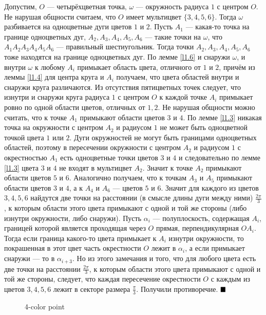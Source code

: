 \documentclass[12pt,a4paper]{article}
\renewcommand{\qed}{$\blacksquare \vspace{5mm}$}
\begin{document}
Допустим, $O$ --- четырёхцветная точка, $\omega$ --- окружность радиуса $1$ с центром $O$. Не нарушая общности считаем, что $O$ имеет мультицвет $\{3, 4, 5, 6\}$. Тогда $\omega$ разбивается на одноцветные дуги цветов $1$ и $2$. Пусть $A_1$ --- какая-то точка на границе одноцветных дуг, $A_2, A_3, A_4, A_5, A_6$ --- такие точки на $\omega$, что $A_1A_2A_3A_4A_5A_6$ --- правильный шестиугольник. Тогда точки $A_2, A_3, A_4, A_5, A_6$ тоже находятся на границе одноцветных дуг. По лемме \ref{l1.6} и снаружи $\omega$, и внутри $\omega$ к любому $A_i$ примыкает область цвета, отличного от $1$ и $2$, причём из леммы \ref{l1.4} для центра круга и $A_i$ получаем, что цвета областей внутри и снаружи круга различаются. Из отсутствия пятицветных точек следует, что изнутри и снаружи круга радиуса $1$ с центром $O$ к каждой точке $A_i$ примыкает ровно по одной области цветов, отличных от $1, 2$. Не нарушая общности можно считать, что к точке $A_1$ примыкают области цветов $3$ и $4$. По лемме \ref{l1.3} никакая точка на окружности с центром $A_2$ и радиусом $1$ не может быть одноцветной точкой цвета $1$ или $2$. Дуги окружностей не могут быть границами одноцветных областей, поэтому в пересечении окружности с центром $A_2$ и радиусом $1$ с окрестностью $A_1$ есть одноцветные точки цветов $3$ и $4$ и следовательно по лемме \ref{l1.3} цвета $3$ и $4$ не входят в мультицвет $A_2$. Значит к точке $A_2$ примыкают области цветов $5$ и $6$. Аналогично получаем, что к точкам $A_3$ и $A_5$ примыкают области цветов $3$ и $4$, а к $A_4$ и $A_6$ --- цветов $5$ и $6$. Значит для каждого из цветов $3, 4, 5, 6$ найдутся две точки на расстоянии (в смысле длины дуги между ними) $\frac{2\pi}{3}$, к которым области этого цвета примыкают с одной и той же стороны (либо изнутри окружности, либо снаружи). Пусть $\alpha_i$ --- полуплоскость, содержащая $A_i$, границей которой является проходящая через $O$ прямая, перпендикулярная $OA_i$. Тогда если граница какого-то цвета примыкает к $A_i$ изнутри окружности, то покрашенная в этот цвет часть окрестности $O$ лежит в $\alpha_i$, а если примыкает снаружи --- то в $\alpha_{i+3}$. Но из этого замечания и того, что для любого цвета есть две точки на расстоянии $\frac{2\pi}{3}$, к которым области этого цвета примыкают с одной и той же стороны, следует, что каждая пересечение окрестности $O$ с каждым из цветов $3, 4, 5, 6$ лежит в секторе размера $\frac{\pi}{3}$. Получили противоречие. \qed

\begin{figure}
    \centering
    
    \caption{4-color point}
    \label{fig:enter-label}
\end{figure}
\end{document}
